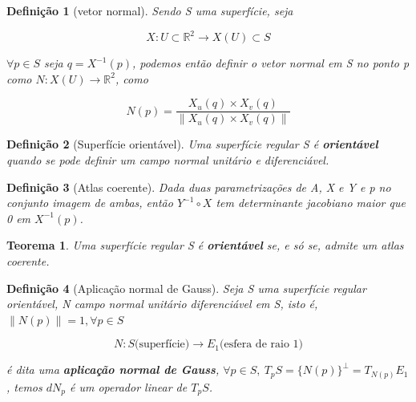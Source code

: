 \documentclass[12pt]{article}
\newtheorem{theorem}{Teorema}
\newtheorem{definition}{Definição}
\begin{document}
\begin{definition}[vetor normal]
Sendo S uma superfície, seja 

$$X: U \subset \mathbb{R}^2 \to X(U) \subset S$$

$\forall p \in S$ seja $q = X^{-1}(p)$, podemos então definir o vetor normal em S no ponto p como $N: X(U) \to \mathbb{R}^2$, como

\begin{equation*}
    N(p) = \frac{X_u (q) \times X_v (q)}{\| X_u (q) \times X_v (q) \|}
\end{equation*}
\end{definition}

\begin{definition}[Superfície orientável]
Uma superfície regular S é \textbf{orientável} quando se pode definir um campo normal unitário e diferenciável.
\end{definition}

\begin{definition}[Atlas coerente]
Dada duas parametrizações de A, X e Y e p no conjunto imagem de ambas, então $Y^{-1} \circ X$ tem determinante jacobiano maior que 0 em $X^{-1}(p)$.
\end{definition}

\begin{theorem}
Uma superfície regular S é \textbf{orientável} se, e só se, admite um atlas coerente.
\end{theorem}

\begin{definition}[Aplicação normal de Gauss]
Seja S uma superfície regular orientável, N campo normal unitário diferenciável em S, isto é, $\| N(p)\| = 1, \forall p \in S$

\begin{equation*}
    N: S \text{(superfície)} \to E_1 \text{(esfera de raio 1)}
\end{equation*}

é dita uma \textbf{aplicação normal de Gauss}, $\forall p \in S,\ T_p S = \{ N(p) \}^\perp = T_{N(p)} E_1$, temos $dN_p$ é um operador linear de $T_p S$. 
\end{definition}
\end{document}
